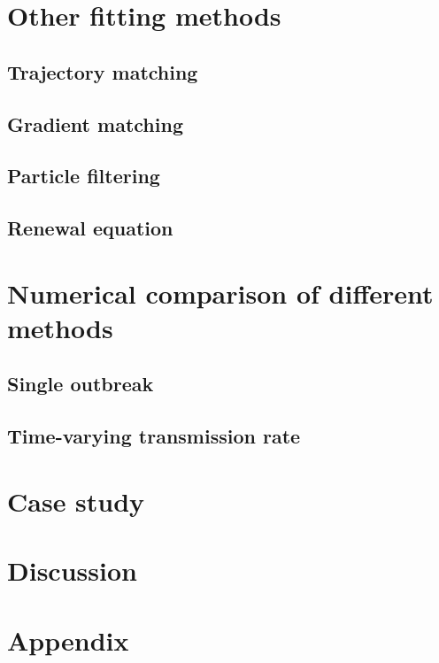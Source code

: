 \documentclass{article}
\begin{document}
\pagebreak

\section{Other fitting methods}

\subsection{Trajectory matching}

\subsection{Gradient matching}

\subsection{Particle filtering}

\subsection{Renewal equation}

\pagebreak

\section{Numerical comparison of different methods}

\subsection{Single outbreak}

\subsection{Time-varying transmission rate}

\pagebreak

\section{Case study}

\section{Discussion}

\pagebreak

\section{Appendix}
\end{document}
